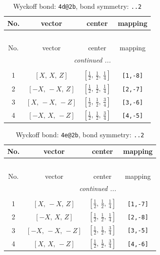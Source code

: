 \documentclass[fleqn,8pt]{jsarticle}
\begin{document}
\begin{longtable}{cccc}
\caption{Wyckoff bond: {\tt 4d@2b}, bond symmetry: {\tt ..2}}
 \\
 \hline \hline
No. & vector & center & mapping \\ \hline \endfirsthead

\multicolumn{3}{l}{\tablename\ \thetable{}} \\
 \hline \hline
No. & vector & center & mapping \\ \hline \endhead

 \hline \hline
\multicolumn{3}{r}{\footnotesize\it continued ...} \\ \endfoot

 \hline \hline
\multicolumn{3}{r}{} \\ \endlastfoot

1 & $\left[ X,\, X,\, Z \right]$ & $\left[ \frac{1}{2},\, \frac{1}{2},\, \frac{1}{4} \right]$ & {\tt [1,-8]} \\ \hline
2 & $\left[ - X,\, - X,\, Z \right]$ & $\left[ \frac{1}{2},\, \frac{1}{2},\, \frac{1}{4} \right]$ & {\tt [2,-7]} \\ \hline
3 & $\left[ X,\, - X,\, - Z \right]$ & $\left[ \frac{1}{2},\, \frac{1}{2},\, \frac{3}{4} \right]$ & {\tt [3,-6]} \\ \hline
4 & $\left[ - X,\, X,\, - Z \right]$ & $\left[ \frac{1}{2},\, \frac{1}{2},\, \frac{3}{4} \right]$ & {\tt [4,-5]} \\
\end{longtable}
\renewcommand{\arraystretch}{1.2}
\begin{longtable}{cccc}
\caption{Wyckoff bond: {\tt 4e@2b}, bond symmetry: {\tt ..2}}
 \\
 \hline \hline
No. & vector & center & mapping \\ \hline \endfirsthead

\multicolumn{3}{l}{\tablename\ \thetable{}} \\
 \hline \hline
No. & vector & center & mapping \\ \hline \endhead

 \hline \hline
\multicolumn{3}{r}{\footnotesize\it continued ...} \\ \endfoot

 \hline \hline
\multicolumn{3}{r}{} \\ \endlastfoot

1 & $\left[ X,\, - X,\, Z \right]$ & $\left[ \frac{1}{2},\, \frac{1}{2},\, \frac{1}{4} \right]$ & {\tt [1,-7]} \\ \hline
2 & $\left[ - X,\, X,\, Z \right]$ & $\left[ \frac{1}{2},\, \frac{1}{2},\, \frac{1}{4} \right]$ & {\tt [2,-8]} \\ \hline
3 & $\left[ - X,\, - X,\, - Z \right]$ & $\left[ \frac{1}{2},\, \frac{1}{2},\, \frac{3}{4} \right]$ & {\tt [3,-5]} \\ \hline
4 & $\left[ X,\, X,\, - Z \right]$ & $\left[ \frac{1}{2},\, \frac{1}{2},\, \frac{3}{4} \right]$ & {\tt [4,-6]} \\
\end{longtable}
\end{document}
